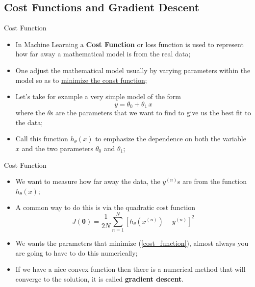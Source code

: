\documentclass[11pt]{beamer}
\begin{document}
\subsection[subsection]{Cost Functions and Gradient Descent}
%
\begin{frame}{Cost Function}
\begin{itemize}
\item In Machine Learning a \textbf{Cost Function} or loss function is used to represent how far away a mathematical model is from the real data;
\item One adjust the mathematical model usually by varying parameters within the model so as to \ul{minimize the const function};
\item Let's take for example a very simple model of the form
$$y = \theta_0 + \theta_1 \,x$$
where the $\theta$s are the parameters that we want to find to give us the best fit to the data;
\item Call this function $h_\theta (x)$ to emphasize the dependence on both the variable $x$ and the two parameters $\theta_0$ and $\theta_1$; 
\end{itemize}
\end{frame}
\begin{frame}{Cost Function}
\begin{itemize}
\item We want to measure how far away the data, the $y^{(n)}$s are from the function $h_\theta (x)$;
\item A common way to do this is via the quadratic cost function
\begin{equation}\label{cost_function}
		J(\mathbf{\theta}) =  \frac{1}{2N} \sum\limits_{n=1}^N \left[h_\theta \left( x^{(n)} \right) - y ^{(n)}\right]^2 
\end{equation}
\item We wants the parameters that minimize (\ref{cost_function}), almost always you are going to have to do this numerically;
\item If we have a nice convex function then there is a numerical method that will converge to the solution, it is called \textbf{gradient descent}. 
\end{itemize}
\end{frame}
%
\end{document}
